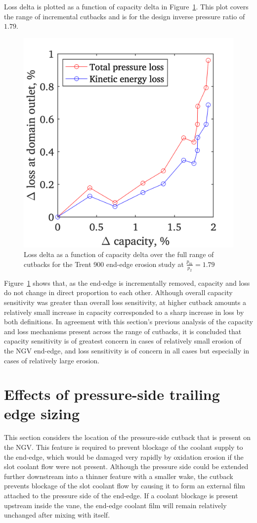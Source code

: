 \documentclass[a4paper, 11pt, oneside]{report}
\begin{document}
Loss delta is plotted as a function of capacity delta in Figure~\ref{fig:ss_capacities_vs_losses}. This plot covers the range of incremental cutbacks and is for the design inverse pressure ratio of $1.79$.

\begin{figure}[H]
	\centering
	\includegraphics[width=.45\textwidth]{figs/ss_capacities_vs_losses.png}
	\caption{Loss delta as a function of capacity delta over the full range of cutbacks for the Trent 900 end-edge erosion study at $\frac{p_{01}}{p_2}=1.79$}
    \label{fig:ss_capacities_vs_losses}
\end{figure}

Figure~\ref{fig:ss_capacities_vs_losses} shows that, as the end-edge is incrementally removed, capacity and loss do not change in direct proportion to each other. Although overall capacity sensitivity was greater than overall loss sensitivity, at higher cutback amounts a relatively small increase in capacity corresponded to a sharp increase in loss by both definitions. In agreement with this section's previous analysis of the capacity and loss mechanisms present across the range of cutbacks, it is concluded that capacity sensitivity is of greatest concern in cases of relatively small erosion of the NGV end-edge, and loss sensitivity is of concern in all cases but especially in cases of relatively large erosion.


\section{Effects of pressure-side trailing edge sizing}
\label{performance_of_an_alternative_trailing_edge_design}

This section considers the location of the pressure-side cutback that is present on the NGV. This feature is required to prevent blockage of the coolant supply to the end-edge, which would be damaged very rapidly by oxidation erosion if the slot coolant flow were not present. Although the pressure side could be extended further downstream into a thinner feature with a smaller wake, the cutback prevents blockage of the slot coolant flow by causing it to form an external film attached to the pressure side of the end-edge. If a coolant blockage is present upstream inside the vane, the end-edge coolant film will remain relatively unchanged after mixing with itself.
\end{document}

